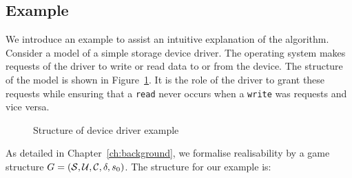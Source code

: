 \subsection{Example}
\label{sec:boundedexample}

We introduce an example to assist an intuitive explanation of the algorithm. Consider a model of a simple storage device driver. The operating system makes requests of the driver to write or read data to or from the device. The structure of the model is shown in Figure~\ref{fig:exampleStructural}. It is the role of the driver to grant these requests while ensuring that a \texttt{read} never occurs when a \texttt{write} was requests and vice versa.

\begin{figure}
    \centering
    \caption{Structure of device driver example}
    \label{fig:exampleStructural}
\end{figure}

As detailed in Chapter~\ref{ch:background}, we formalise realisability by a game structure $G = (\mathcal{S}, \mathcal{U}, \mathcal{C}, \delta, s_0)$. The structure for our example is:

